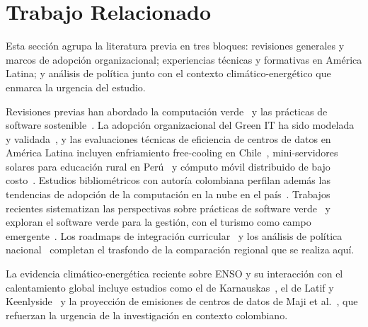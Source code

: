 \documentclass[conference]{IEEEtran}
\begin{document}
\section{Trabajo Relacionado}\label{sec:tr}
Esta secci\'on agrupa la literatura previa en tres bloques: revisiones generales y marcos de adopci\'on organizacional; experiencias t\'ecnicas y formativas en Am\'erica Latina; y an\'alisis de pol\'itica junto con el contexto clim\'atico-energ\'etico que enmarca la urgencia del estudio.

Revisiones previas han abordado la computaci\'on verde~\cite{harmon2009,rodriguez2022,sarasti2014} y las pr\'acticas de software sostenible~\cite{soto2022,currie2024,botero2023}. La adopci\'on organizacional del Green IT ha sido modelada y validada~\cite{bustamante2014,cordero2022,molla2009}, y las evaluaciones t\'ecnicas de eficiencia de centros de datos en Am\'erica Latina incluyen enfriamiento free-cooling en Chile~\cite{diaz2017}, mini-servidores solares para educaci\'on rural en Per\'u~\cite{palomino2019} y c\'omputo m\'ovil distribuido de bajo costo~\cite{petrocelli2021}. Estudios bibliom\'etricos con autor\'ia colombiana perfilan adem\'as las tendencias de adopci\'on de la computaci\'on en la nube en el pa\'is~\cite{botero2026}. Trabajos recientes sistematizan las perspectivas sobre pr\'acticas de software verde~\cite{miranda2025} y exploran el software verde para la gesti\'on, con el turismo como campo emergente~\cite{wu2025}. Los roadmaps de integraci\'on curricular~\cite{moreira2024,fontanarrosa2024} y los an\'alisis de pol\'itica nacional~\cite{bossa2023,rodriguezcorrea2023} completan el trasfondo de la comparaci\'on regional que se realiza aqu\'i.

La evidencia clim\'atico-energ\'etica reciente sobre ENSO y su interacci\'on con el calentamiento global incluye estudios como el de Karnauskas~\cite{karnauskas2025}, el de Latif y Keenlyside~\cite{latif2009} y la proyecci\'on de emisiones de centros de datos de Maji et al.~\cite{maji2025}, que refuerzan la urgencia de la investigaci\'on en contexto colombiano.
\end{document}
